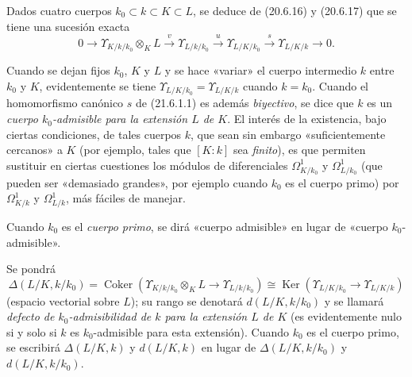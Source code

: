 \begin{env}[21.6.1]
\label{0.21.6.1-fr}
Dados cuatro cuerpos $k_0\subset k\subset K\subset L$, se deduce de
(20.6.16) y (20.6.17) que se tiene una sucesión exacta
\begin{equation}
\tag{21.6.1.1}
\label{0.21.6.1.1-fr}
0\to\Upsilon_{K/k/k_0}\otimes_KL\xrightarrow{v}\Upsilon_{L/k/k_0}
\xrightarrow{u}\Upsilon_{L/K/k_0}\xrightarrow{s}\Upsilon_{L/K/k}\to0.
\end{equation}

Cuando se dejan fijos $k_0$, $K$ y $L$ y se hace «variar» el cuerpo intermedio
$k$ entre $k_0$ y $K$, evidentemente se tiene
$\Upsilon_{L/K/k_0}=\Upsilon_{L/K/k}$ cuando $k=k_0$. Cuando el homomorfismo
canónico $s$ de (21.6.1.1) es además \emph{biyectivo}, se dice que $k$ es un \emph{cuerpo
$k_0$-admisible para la extensión $L$ de $K$}. El interés de la existencia, bajo
ciertas condiciones, de tales cuerpos $k$, que sean sin embargo
«suficientemente cercanos» a $K$ (por ejemplo, tales que $[K:k]$ sea \emph{finito}), es
que permiten sustituir en ciertas cuestiones los módulos de diferenciales
$\Omega^1_{K/k_0}$ y $\Omega^1_{L/k_0}$ (que pueden ser «demasiado grandes»,
por ejemplo cuando $k_0$ es el cuerpo primo) por
$\Omega^1_{K/k}$ y $\Omega^1_{L/k}$, más fáciles de manejar.

Cuando $k_0$ es el \emph{cuerpo primo}, se dirá «cuerpo admisible» en lugar
de «cuerpo $k_0$-admisible».
 
Se pondrá
\begin{equation}
\label{0.21.6.1.2-fr}
\tag{21.6.1.2}
\Delta(L/K,k/k_0)=\operatorname{Coker}
(\Upsilon_{K/k/k_0}\otimes_KL\to\Upsilon_{L/k/k_0})
\cong\operatorname{Ker}(\Upsilon_{L/K/k_0}\to\Upsilon_{L/K/k})
\end{equation}
(espacio vectorial sobre $L$); su rango se denotará $d(L/K,k/k_0)$ y se llamará
\emph{defecto de $k_0$-admisibilidad de $k$ para la extensión $L$ de $K$}
(es evidentemente nulo si y solo si $k$ es $k_0$-admisible para esta
extensión). Cuando $k_0$ es el cuerpo primo, se escribirá
$\Delta(L/K,k)$ y $d(L/K,k)$ en lugar de $\Delta(L/K,k/k_0)$ y
$d(L/K,k/k_0)$.
\end{env}

